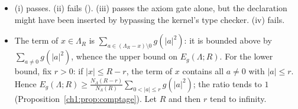 \begin{itemize}
\item[\ref{ch1:ex:lean}.] (i) passes. (ii) fails (). (iii) passes the axiom gate alone, but the declaration might have been inserted by bypassing the
kernel's type checker. (iv) fails.
\item[\ref{ch1:ex:fatou}.] The term of $x\in\Lambda_R$ is $\sum_{a\in(\Lambda_R-x)\setminus0}g(|a|^2)$: it is bounded above by $\sum_{a\ne0}g(|a|^2)$, whence the upper bound on $E_g(\Lambda;R)$.
For the lower bound, fix $r>0$: if $|x|\le R-r$, the term of $x$ contains all $a\ne0$ with $|a|\le r$. Hence
$E_g(\Lambda;R)\ge\frac{N_\Lambda(R-r)}{N_\Lambda(R)}\sum_{0<|a|\le r}g(|a|^2)$; the ratio tends to $1$ (Proposition~\ref{ch1:prop:comptage}). Let $R$ and then $r$ tend to infinity.
\end{itemize}
